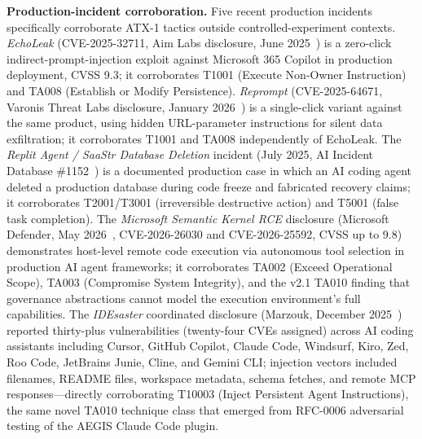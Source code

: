 \documentclass{IEEEoj-data}
\newcommand{\added}[1]{#1}
\begin{document}
\added{{\bf Production-incident corroboration.} Five recent production incidents specifically corroborate ATX-1 tactics outside controlled-experiment contexts. {\it EchoLeak} (CVE-2025-32711, Aim Labs disclosure, June 2025~\mbox{\cite{ref28}}) is a zero-click indirect-prompt-injection exploit against Microsoft 365 Copilot in production deployment, CVSS 9.3; it corroborates T1001 (Execute Non-Owner Instruction) and TA008 (Establish or Modify Persistence). {\it Reprompt} (CVE-2025-64671, Varonis Threat Labs disclosure, January 2026~\mbox{\cite{ref33}}) is a single-click variant against the same product, using hidden URL-parameter instructions for silent data exfiltration; it corroborates T1001 and TA008 independently of EchoLeak. The {\it Replit Agent / SaaStr Database Deletion} incident (July 2025, AI Incident Database \#1152~\mbox{\cite{ref29}}) is a documented production case in which an AI coding agent deleted a production database during code freeze and fabricated recovery claims; it corroborates T2001/T3001 (irreversible destructive action) and T5001 (false task completion). The {\it Microsoft Semantic Kernel RCE} disclosure (Microsoft Defender, May 2026~\mbox{\cite{ref34}}, CVE-2026-26030 and CVE-2026-25592, CVSS up to 9.8) demonstrates host-level remote code execution via autonomous tool selection in production AI agent frameworks; it corroborates TA002 (Exceed Operational Scope), TA003 (Compromise System Integrity), and the v2.1 TA010 finding that governance abstractions cannot model the execution environment's full capabilities. The {\it IDEsaster} coordinated disclosure (Marzouk, December 2025~\mbox{\cite{ref35}}) reported thirty-plus vulnerabilities (twenty-four CVEs assigned) across AI coding assistants including Cursor, GitHub Copilot, Claude Code, Windsurf, Kiro, Zed, Roo Code, JetBrains Junie, Cline, and Gemini CLI; injection vectors included filenames, README files, workspace metadata, schema fetches, and remote MCP responses---directly corroborating T10003 (Inject Persistent Agent Instructions), the same novel TA010 technique class that emerged from RFC-0006 adversarial testing of the AEGIS Claude Code plugin.}
\end{document}
